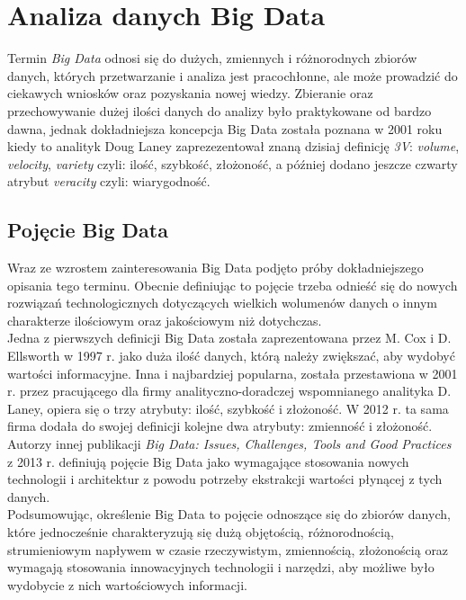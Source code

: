 \chapter{Analiza danych Big Data}

Termin \textit{Big Data} odnosi się do dużych, zmiennych i różnorodnych zbiorów danych, których przetwarzanie i analiza jest pracochłonne, ale może prowadzić do ciekawych wniosków oraz pozyskania nowej wiedzy. Zbieranie oraz przechowywanie dużej ilości danych do analizy było praktykowane od bardzo dawna, jednak dokładniejsza koncepcja Big Data została poznana w 2001 roku kiedy to analityk Doug Laney zaprezezentował znaną dzisiaj definicję \textit{3V}: \textit{volume}, \textit{velocity}, \textit{variety} czyli: ilość, szybkość, złożoność, a później dodano jeszcze czwarty atrybut \textit{veracity} czyli: wiarygodność.

\section{Pojęcie Big Data}
Wraz ze wzrostem zainteresowania Big Data podjęto próby dokładniejszego opisania tego terminu. Obecnie definiując to pojęcie trzeba odnieść się do nowych rozwiązań technologicznych dotyczących wielkich wolumenów danych o innym charakterze ilościowym oraz jakościowym niż dotychczas. \\
Jedna z pierwszych definicji Big Data została zaprezentowana przez M. Cox i D. Ellsworth w 1997 r. jako duża ilość danych, którą należy zwiększać, aby wydobyć wartości informacyjne. Inna i najbardziej popularna, została przestawiona w 2001 r. przez pracującego dla firmy analityczno-doradczej wspomnianego analityka D. Laney, opiera się o trzy atrybuty: ilość, szybkość i złożoność. W 2012 r. ta sama firma dodała do swojej definicji kolejne dwa atrybuty: zmienność i złożoność. Autorzy innej publikacji \textit{Big Data: Issues, Challenges, Tools and Good Practices} z 2013 r. definiują pojęcie Big Data jako wymagające stosowania nowych technologii i architektur z powodu potrzeby ekstrakcji wartości płynącej z tych danych. \\
Podsumowując, określenie Big Data to pojęcie odnoszące się do zbiorów danych, które jednocześnie charakteryzują się dużą objętością, różnorodnością, strumieniowym napływem w czasie rzeczywistym, zmiennością, złożonością oraz wymagają stosowania innowacyjnych technologii i narzędzi, aby możliwe było wydobycie z nich wartościowych informacji.

